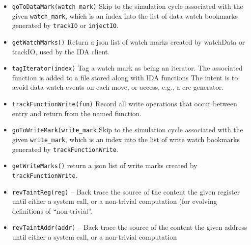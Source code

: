\documentclass[titlepage]{article}
\begin{document}
\begin{itemize}
\item {\tt goToDataMark(watch\_mark)}  Skip to the simulation cycle associated with the given {\tt watch\_mark}, which is an index into the list of data watch bookmarks generated by {\tt trackIO} or {\tt injectIO}.

\item {\tt getWatchMarks()} Return a json list of watch marks created by watchData or trackIO, used by the IDA client.

\item {\tt tagIterator(index)} Tag a watch mark as being an iterator.  The associated function is added to a file stored along with IDA functions
The intent is to avoid data watch events on each move, or access, e.g., a crc generator.

\item {\tt trackFunctionWrite(fun)} Record all write operations that occur between entry and return from the named function.

\item {\tt goToWriteMark(write\_mark} Skip to the simulation cycle associated with the given {\tt write\_mark}, which is an index into the list of 
write watch bookmarks generated by {\tt trackFunctionWrite}.

\item {\tt getWriteMarks()} return a json list of write marks created by {\tt trackFunctionWrite}.

\item {\tt revTaintReg(reg)} – Back trace the source of the content the given register until either a system call, or a non-trivial computation (for evolving definitions of “non-trivial”.  

\item {\tt revTaintAddr(addr)} -- Back trace the source of the content the given address until either a system call, or a non-trivial computation


\end{itemize}
\end{document}

